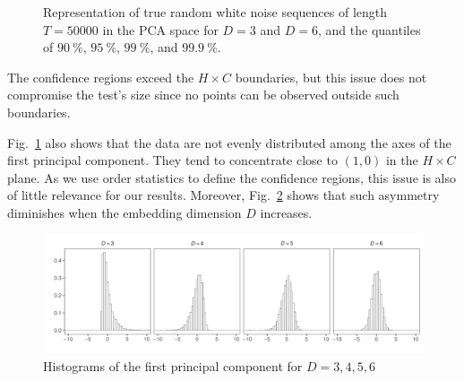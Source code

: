 \documentclass[alpha-refs]{wiley-article}
\begin{document}
\begin{figure}[hbt]
	\centering
	\caption{Representation of true random white noise sequences of length $T = 50000$ in the PCA space for $D = 3$ and $D = 6$, and the quantiles of $\SI{90}{\percent}$, $\SI{95}{\percent}$, $\SI{99}{\percent}$, and $\SI{99.9}{\percent}$.}
	\label{fig:HC-PCA}
\end{figure} 

The confidence regions exceed the $H \times C$ boundaries, but this issue does not compromise the test's size since no points can be observed outside such boundaries.

Fig.~\ref{fig:HC-PCA} also shows that the data are not evenly distributed among the axes of the first principal component.
They tend to concentrate close to $(1,0)$ in the $H\times C$ plane.
As we use order statistics to define the confidence regions, this issue is also of little relevance for our results.
Moreover, Fig.~\ref{fig:PCA-Hist} shows that such asymmetry diminishes when the embedding dimension $D$ increases.

\begin{figure}[hbt]
	\centering
	\includegraphics[width=\linewidth]{PCA-hist-50k}
	\caption{Histograms of the first principal component for $D=3,4,5,6$}
	\label{fig:PCA-Hist}
\end{figure}
\end{document}

